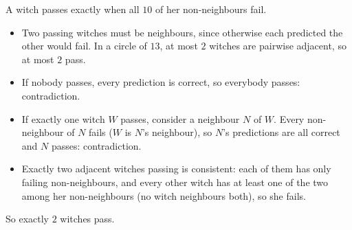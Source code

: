 A witch passes exactly when all $10$ of her non-neighbours fail.
\begin{itemize}
\item Two passing witches must be neighbours, since otherwise each predicted the other would fail. In a circle of $13$, at most $2$ witches are pairwise adjacent, so at most $2$ pass.
\item If nobody passes, every prediction is correct, so everybody passes: contradiction.
\item If exactly one witch $W$ passes, consider a neighbour $N$ of $W$. Every non-neighbour of $N$ fails ($W$ is $N$'s neighbour), so $N$'s predictions are all correct and $N$ passes: contradiction.
\item Exactly two adjacent witches passing is consistent: each of them has only failing non-neighbours, and every other witch has at least one of the two among her non-neighbours (no witch neighbours both), so she fails.
\end{itemize}
So exactly $\boxed{2}$ witches pass.
